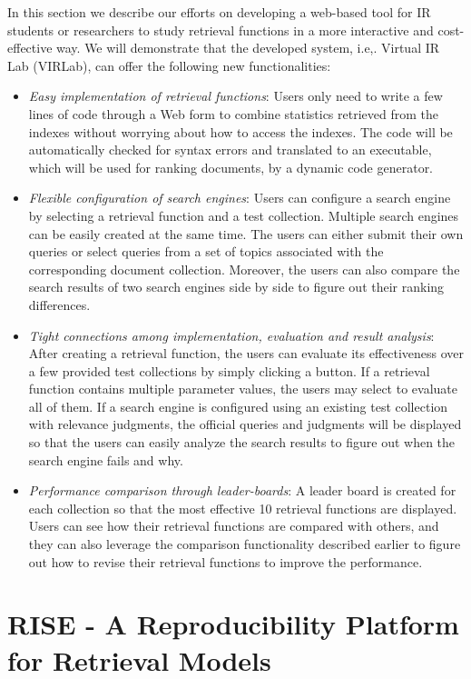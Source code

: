 In this section we describe our efforts on developing a web-based
tool for IR students or researchers to study retrieval functions 
in a more interactive and cost-effective way. We will
demonstrate that the developed system, i.e,. Virtual IR Lab
(VIRLab), can offer the following new functionalities:

\begin{itemize}
\item \textit{Easy implementation of retrieval functions}: 
Users only need to write a few lines of code through a Web form
to combine statistics retrieved from the indexes without 
worrying about how to access the indexes. The code will be 
automatically checked for syntax errors and translated to an 
executable, which will be used for ranking documents, 
by a dynamic code generator.
\item \textit{Flexible configuration of search engines}: 
Users can configure a search engine by selecting a retrieval 
function and a test collection. Multiple search engines can be
easily created at the same time. The users can either submit 
their own queries or select queries from a set of topics 
associated with the corresponding document collection. 
Moreover, the users can also compare the search results 
of two search engines side by side to figure out their 
ranking differences.
\item \textit{Tight connections among implementation, evaluation
and result analysis}: 
After creating a retrieval function, the users can evaluate its 
effectiveness over a few provided test collections by simply 
clicking a button. If a retrieval function contains multiple 
parameter values, the users may select to evaluate all of them. 
If a search engine is configured using an existing test collection 
with relevance judgments, the official queries and judgments 
will be displayed so that the users can easily analyze the search 
results to figure out when the search engine fails and why.
\item \textit{Performance comparison through leader-boards}: 
A leader board is created for each collection so that the most
effective 10 retrieval functions are displayed. Users
can see how their retrieval functions are compared with
others, and they can also leverage the comparison functionality 
described earlier to figure out how to revise
their retrieval functions to improve the performance.
\end{itemize}

\section{RISE - A Reproducibility Platform for Retrieval Models} 
\label{sec:system}

